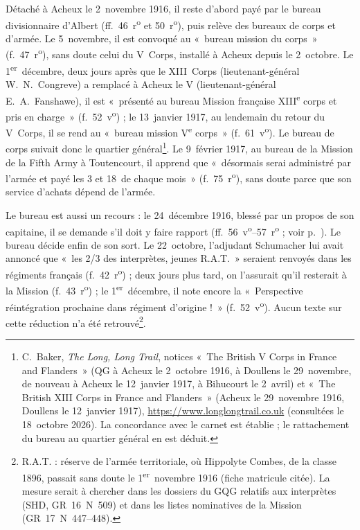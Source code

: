 Détaché à Acheux le 2~novembre 1916, il reste d'abord payé par le bureau divisionnaire d'Albert (ff.~46~r\textsuperscript{o} et 50~r\textsuperscript{o}), puis relève des bureaux de corps et d'armée. Le 5~novembre, il est convoqué au «~bureau mission du corps~» (f.~47~r\textsuperscript{o}), sans doute celui du V~Corps, installé à Acheux depuis le 2~octobre. Le 1\textsuperscript{er}~décembre, deux jours après que le XIII~Corps (lieutenant-général W.~N.~Congreve) a remplacé à Acheux le V (lieutenant-général E.~A.~Fanshawe), il est «~présenté au bureau Mission française XIII\textsuperscript{e} corps et pris en charge~» (f.~52~v\textsuperscript{o}) ; le 13~janvier 1917, au lendemain du retour du V~Corps, il se rend au «~bureau mission V\textsuperscript{e} corps~» (f.~61~v\textsuperscript{o}). Le bureau de corps suivait donc le quartier général\footnote{C.~Baker, \textit{The Long, Long Trail}, notices «~The British V Corps in France and Flanders~» (QG à Acheux le 2~octobre 1916, à Doullens le 29~novembre, de nouveau à Acheux le 12~janvier 1917, à Bihucourt le 2~avril) et «~The British XIII Corps in France and Flanders~» (Acheux le 29~novembre 1916, Doullens le 12~janvier 1917), \url{https://www.longlongtrail.co.uk} (consultées le 18~octobre 2026). La concordance avec le carnet est établie ; le rattachement du bureau au quartier général en est déduit.}. Le 9~février 1917, au bureau de la Mission de la Fifth Army à Toutencourt, il apprend que «~désormais serai administré par l'armée et payé les 3 et 18~de chaque mois~» (f.~75~r\textsuperscript{o}), sans doute parce que son service d'achats dépend de l'armée.

Le bureau est aussi un recours : le 24~décembre 1916, blessé par un propos de son capitaine, il se demande s'il doit y faire rapport (ff.~56~v\textsuperscript{o}--57~r\textsuperscript{o} ; voir p.~\pageref{intro:bloody}). Le bureau décide enfin de son sort. Le 22~octobre, l'adjudant Schumacher lui avait annoncé que «~les 2/3 des interprètes, jeunes R.A.T.~» seraient renvoyés dans les régiments français (f.~42~r\textsuperscript{o}) ; deux jours plus tard, on l'assurait qu'il resterait à la Mission (f.~43~r\textsuperscript{o}) ; le 1\textsuperscript{er}~décembre, il note encore la «~Perspective réintégration prochaine dans régiment d'origine !~» (f.~52~v\textsuperscript{o}). Aucun texte sur cette réduction n'a été retrouvé\footnote{R.A.T. : réserve de l'armée territoriale, où Hippolyte Combes, de la classe 1896, passait sans doute le 1\textsuperscript{er}~novembre 1916 (fiche matricule citée). La mesure serait à chercher dans les dossiers du GQG relatifs aux interprètes (SHD, GR~16~N~509) et dans les listes nominatives de la Mission (GR~17~N~447--448).}.

